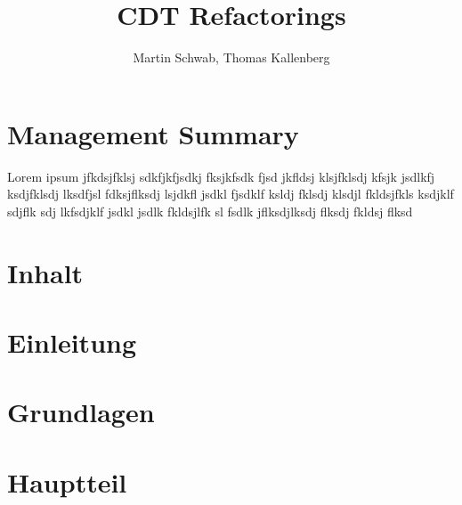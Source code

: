 \documentclass[a4paper,10pt]{scrreprt}
\title{CDT Refactorings}
\author{Martin Schwab, Thomas Kallenberg}
\begin{document}
\maketitle

\begin{abstract}
\end{abstract}

\section{Management Summary}
Lorem ipsum jfkdsjfklsj sdkfjkfjsdkj fksjkfsdk fjsd
jkfldsj klsjfklsdj kfsjk jsdlkfj ksdjfklsdj lksdfjsl
fdksjflksdj lsjdkfl jsdkl fjsdklf ksldj fklsdj klsdjl
fkldsjfkls ksdjklf sdjflk sdj lkfsdjklf jsdkl jsdlk
fkldsjlfk sl fsdlk jflksdjlksdj flksdj fkldsj flksd
\section{Inhalt}
\section{Einleitung}
\section{Grundlagen}
\section{Hauptteil}

\end{document}
